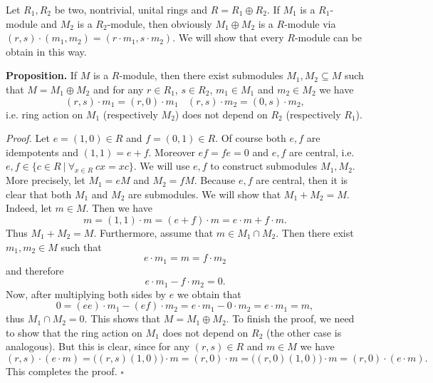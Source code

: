 \documentclass[12pt]{article}
\begin{document}
Let $R_1,R_2$ be two, nontrivial, unital rings and $R=R_1\oplus R_2$. If $M_1$ is a $R_1$-module and $M_2$ is a $R_2$-module, then obviously $M_1\oplus M_2$ is a $R$-module via $(r,s)\cdot (m_1,m_2)=(r\cdot m_1,s\cdot m_2)$. We will show that every $R$-module can be obtain in this way.

\textbf{Proposition.} If $M$ is a $R$-module, then there exist submodules $M_1,M_2\subseteq M$ such that $M=M_1\oplus M_2$ and for any $r\in R_1$, $s\in R_2$, $m_1\in M_1$ and $m_2\in M_2$ we have 
$$(r,s)\cdot m_1=(r,0)\cdot m_1\ \ \ \ (r,s)\cdot m_2=(0,s)\cdot m_2,$$
i.e. ring action on $M_1$ (respectively $M_2$) does not depend on $R_2$ (respectively $R_1$).

\textit{Proof.} Let $e=(1,0)\in R$ and $f=(0,1)\in R$. Of course both $e,f$ are idempotents and $(1,1)=e+f$. Moreover $ef=fe=0$ and $e,f$ are central, i.e. $e,f\in \{c\in R\ \big| \ \forall_{x\in R}\ cx=xc\}$. We will use $e,f$ to construct submodules $M_1,M_2$. More precisely, let $M_1=eM$ and $M_2=fM$. Because $e,f$ are central, then it is clear that both $M_1$ and $M_2$ are submodules. We will show that $M_1+M_2=M$. Indeed, let $m\in M$. Then we have
$$m=(1,1)\cdot m=(e+f)\cdot m=e\cdot m + f\cdot m.$$
Thus $M_1+M_2=M$. Furthermore, assume that $m\in M_1\cap M_2$. Then there exist $m_1,m_2\in M$ such that
$$e\cdot m_1=m=f\cdot m_2$$
and therefore 
$$e\cdot m_1 - f\cdot m_2=0.$$
Now, after multiplying both sides by $e$ we obtain that
$$0=(ee)\cdot m_1 - (ef)\cdot m_2=e\cdot m_1-0\cdot m_2=e\cdot m_1=m,$$
thus $M_1\cap M_2=0$. This shows that $M=M_1\oplus M_2$. To finish the proof, we need to show that the ring action on $M_1$ does not depend on $R_2$ (the other case is analogous). But this is clear, since for any $(r,s)\in R$ and $m\in M$ we have
$$(r,s)\cdot (e\cdot m)=\big( (r,s)(1,0)\big) \cdot m=(r,0)\cdot m=\big( (r,0)(1,0)\big)\cdot m=(r,0)\cdot(e\cdot m).$$
This completes the proof. $\square$
\end{document}
